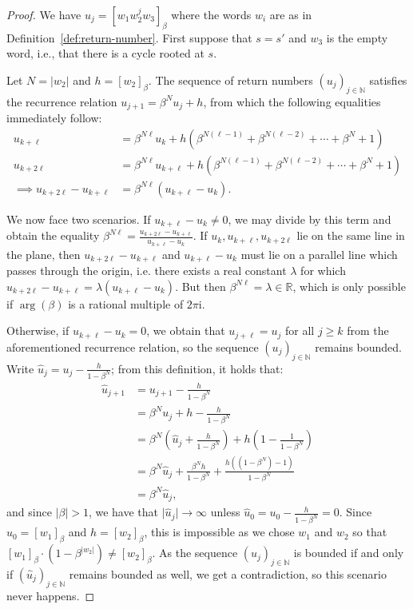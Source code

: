 \documentclass{amsart}
\newcommand{\N}{\mathbb{N}}
\newcommand{\R}{\mathbb{R}}
\newcommand{\ii}{\mathrm{i}}
\newtheorem*{main theorem}{Theorem \ref{thm:main-gaussian}}
\theoremstyle{definition}
\begin{document}
\begin{proof}

We have $u_j=[w_1w_2^j w_3]_\beta$ where the words $w_i$ are as in Definition~\ref{def:return-number}. First suppose that $s=s'$ and $w_3$ is the empty word, i.e., that there is a cycle rooted at $s$.

    Let $N=\lvert w_2\rvert$ and $h=[w_2]_\beta$. The sequence of return numbers $(u_j)_{j\in\N}$  satisfies the recurrence relation $u_{j+1} = \beta^N u_j + h$, from which the following equalities immediately follow:
        \begin{align*}
            u_{k+\ell} &= \beta^{N\ell}u_k+h(\beta^{N(\ell - 1)} + \beta^{N(\ell-2)} + \cdots + \beta ^N + 1)  \\
            u_{k+2\ell} &= \beta^{N\ell}u_{k+\ell}+h(\beta^{N(\ell - 1)} + \beta^{N(\ell-2)} + \cdots + \beta ^N + 1)  \\
            {}\implies u_{k+2\ell}-u_{k+\ell} &= \beta^{N\ell}(u_{k+\ell}-u_k).
        \end{align*}
        
    We now face two scenarios. If $u_{k+\ell}-u_k\ne 0$, we may divide by this term and obtain the equality $\beta^{N\ell}=\frac{u_{k+2\ell}-u_{k+\ell}}{u_{k+\ell}-u_k}$. If $u_k,u_{k+\ell},u_{k+2\ell}$ lie on the same line in the plane, then $u_{k+2\ell}-u_{k+\ell}$ and $u_{k+\ell}-u_{k}$ must lie on a parallel line which passes through the origin, i.e. there exists a real constant $\lambda$ for which $u_{k+2\ell}-u_{k+\ell} = \lambda(u_{k+\ell}-u_{k})$. But then $\beta^{N\ell}=\lambda\in\R$, which is only possible if $\arg(\beta)$ is a rational multiple of $2\pi\ii$. 
    

    Otherwise, if $u_{k+\ell}-u_k=0$, we obtain that $u_{j+\ell}=u_j$ for all $j\ge k$ from the aforementioned recurrence relation, so the sequence $(u_j)_{j\in\N}$ remains bounded. Write $\hat{u}_j=u_j-\frac{h}{1-\beta^N}$; from this definition, it holds that:
        \begin{align*}
            \hat{u}_{j+1}&=u_{j+1}-\frac{h}{1-\beta^N}\\
            &=\beta^N u_j+h-\frac{h}{1-\beta^N} \\
            &=\beta^N\left(\hat{u}_j+\frac{h}{1-\beta^N}\right)+h\left( 1-\frac{1}{1-\beta^N}\right)\\
            &=\beta^N\hat{u}_j+\frac{\beta^Nh}{1-\beta^N} + \frac{h((1-\beta^N)-1)}{1-\beta^N}\\
            &=\beta^N\hat{u}_j,
        \end{align*}
    and since $\lvert\beta\rvert>1$, we have that $\lvert \hat{u}_j\rvert\to\infty$ unless $\hat{u}_0=u_0-\frac{h}{1-\beta^N}=0$. Since $u_0=[w_1]_\beta$ and $h=[w_2]_\beta$, this is impossible as we chose $w_1$ and $w_2$ so that $[w_1]_\beta \cdot (1-\beta^{\lvert w_2\rvert}) \ne  [w_2]_\beta$. As the sequence $(u_j)_{j\in\N}$ is bounded if and only if $(\hat{u}_j)_{j\in\N}$ remains bounded as well, we get a contradiction, so this scenario never happens.
    

\end{proof}
\end{document}
